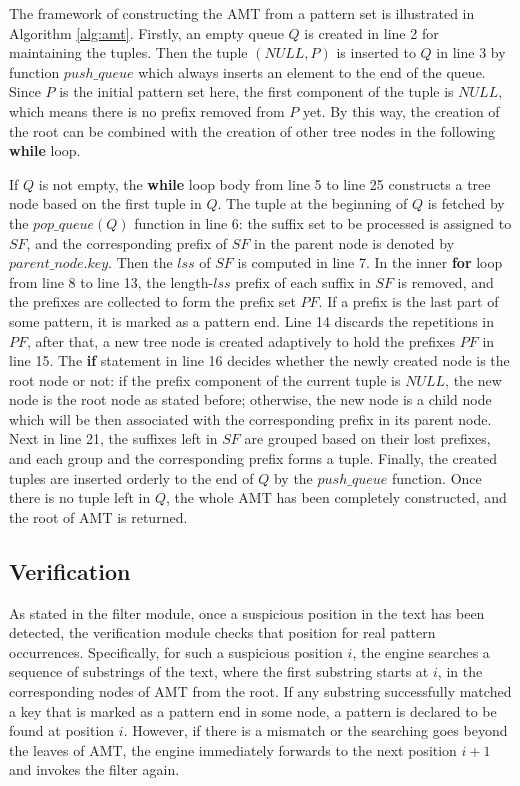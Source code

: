 \documentclass{article}
\begin{document}
The framework of constructing the AMT from a pattern set is
illustrated in Algorithm \ref{alg:amt}. Firstly, an empty queue $Q$ is
created in line 2 for maintaining the tuples. Then the tuple
$(NULL, P)$ is inserted to $Q$ in line 3 by function $push\_queue$
which always inserts an element to the end of the queue. Since $P$ is
the initial pattern set here, the first component of the tuple is
$NULL$, which means there is no prefix removed from $P$ yet. By this
way, the creation of the root can be combined with the creation of
other tree nodes in the following \textbf{while} loop.

If $Q$ is not empty, the \textbf{while} loop body from line 5 to line
25 constructs a tree node based on the first tuple in $Q$. The tuple
at the beginning of $Q$ is fetched by the $pop\_queue(Q)$ function in
line 6: the suffix set to be processed is assigned to $SF$, and the
corresponding prefix of $SF$ in the parent node is denoted by
$parent\_node.key$. Then the $lss$ of $SF$ is computed in line 7. In
the inner \textbf{for} loop from line 8 to line 13, the length-$lss$
prefix of each suffix in $SF$ is removed, and the prefixes are
collected to form the prefix set $PF$. If a prefix is the last part of
some pattern, it is marked as a pattern end. Line 14 discards the
repetitions in $PF$, after that, a new tree node is created adaptively
to hold the prefixes $PF$ in line 15. The \textbf{if} statement in
line 16 decides whether the newly created node is the root node or
not: if the prefix component of the current tuple is $NULL$, the new
node is the root node as stated before; otherwise, the new node is a
child node which will be then associated with the corresponding prefix
in its parent node. Next in line 21, the suffixes left in $SF$ are
grouped based on their lost prefixes, and each group and the
corresponding prefix forms a tuple. Finally, the created tuples are
inserted orderly to the end of $Q$ by the $push\_queue$ function. Once
there is no tuple left in $Q$, the whole AMT has been completely
constructed, and the root of AMT is returned.

\subsection{Verification}
\label{subsec:matching}

As stated in the filter module, once a suspicious position in the text
has been detected, the verification module checks that position for
real pattern occurrences. Specifically, for such a suspicious position
$i$, the engine searches a sequence of substrings of the text, where
the first substring starts at $i$, in the corresponding nodes of AMT
from the root. If any substring successfully matched a key that is
marked as a pattern end in some node, a pattern is declared to be
found at position $i$. However, if there is a mismatch or the
searching goes beyond the leaves of AMT, the engine immediately
forwards to the next position $i+1$ and invokes the filter again.
\end{document}
